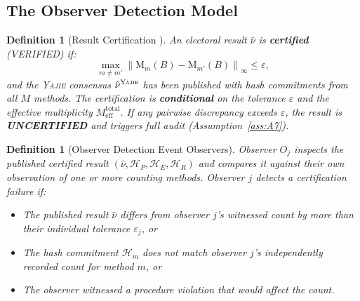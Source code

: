 \documentclass[11pt,a4paper]{article}
\newtheorem{definition}[theorem]{Definition}
\theoremstyle{definition}
\newcommand{\Yajie}{\textsc{Yajie}}
\newcommand{\norm}[1]{\left\lVert#1\right\rVert}
\newcommand{\method}[1]{\mathrm{M}_{#1}}
\newcommand{\auditConsensus}{\hat{\nu}^{\Yajie}}
\begin{document}
\subsection{The Observer Detection Model}
\begin{definition}[Result Certification ]
\label{def:certification}
An electoral result $\hat{\nu}$ is \textbf{certified} (VERIFIED) if:
\begin{equation}
    \max_{m \neq m'} \norm{\method{m}(B) - \method{m'}(B)}_\infty \leq \varepsilon,
    \label{eq:certification_condition}
\end{equation}
and the \Yajie{} consensus $\auditConsensus$ has been published with hash commitments from all $M$ methods. The certification is \textbf{conditional} on the tolerance $\varepsilon$ and the effective multiplicity $M_{\text{eff}}^{\text{total}}$. If any pairwise discrepancy exceeds $\varepsilon$, the result is \textbf{UNCERTIFIED} and triggers full audit (Assumption~\ref{ass:A7}).
\end{definition}
\begin{definition}[Observer Detection Event Observers]
\label{def:observer_detection}
Observer $O_j$ inspects the published certified result $(\hat{\nu}, \mathcal{H}_P, \mathcal{H}_E, \mathcal{H}_R)$ and compares it against their own observation of one or more counting methods. Observer $j$ detects a certification failure if:
\begin{itemize}
    \item The published result $\hat{\nu}$ differs from observer $j$'s witnessed count by more than their individual tolerance $\varepsilon_j$, or
    \item The hash commitment $\mathcal{H}_m$ does not match observer $j$'s independently recorded count for method $m$, or
    \item The observer witnessed a procedure violation that would affect the count.
\end{itemize}
\end{definition}
\end{document}
